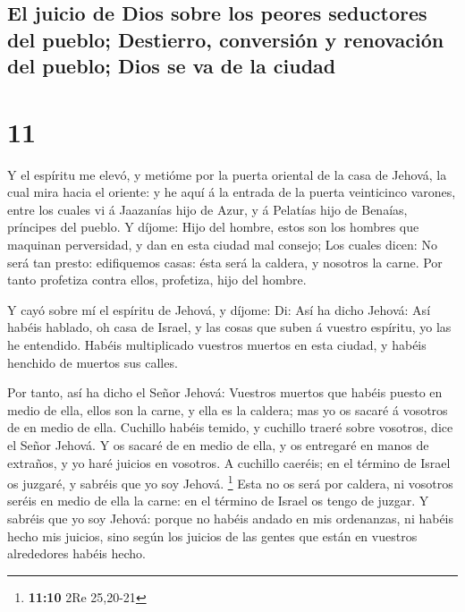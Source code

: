 \hypertarget{el-juicio-de-dios-sobre-los-peores-seductores-del-pueblo-destierro-conversiuxf3n-y-renovaciuxf3n-del-pueblo-dios-se-va-de-la-ciudad}{%
\subsection{El juicio de Dios sobre los peores seductores del pueblo;
Destierro, conversión y renovación del pueblo; Dios se va de la
ciudad}\label{el-juicio-de-dios-sobre-los-peores-seductores-del-pueblo-destierro-conversiuxf3n-y-renovaciuxf3n-del-pueblo-dios-se-va-de-la-ciudad}}

\hypertarget{section-10}{%
\section{11}\label{section-10}}

 Y el espíritu me elevó, y metióme por la puerta oriental
de la casa de Jehová, la cual mira hacia el oriente: y he aquí á la
entrada de la puerta veinticinco varones, entre los cuales vi á
Jaazanías hijo de Azur, y á Pelatías hijo de Benaías, príncipes del
pueblo.  Y díjome: Hijo del hombre, estos son los hombres
que maquinan perversidad, y dan en esta ciudad mal consejo;
 Los cuales dicen: No será tan presto: edifiquemos casas:
ésta será la caldera, y nosotros la carne.  Por tanto
profetiza contra ellos, profetiza, hijo del hombre.

 Y cayó sobre mí el espíritu de Jehová, y díjome: Di: Así
ha dicho Jehová: Así habéis hablado, oh casa de Israel, y las cosas que
suben á vuestro espíritu, yo las he entendido.  Habéis
multiplicado vuestros muertos en esta ciudad, y habéis henchido de
muertos sus calles.

 Por tanto, así ha dicho el Señor Jehová: Vuestros muertos
que habéis puesto en medio de ella, ellos son la carne, y ella es la
caldera; mas yo os sacaré á vosotros de en medio de ella. 
Cuchillo habéis temido, y cuchillo traeré sobre vosotros, dice el Señor
Jehová.  Y os sacaré de en medio de ella, y os entregaré
en manos de extraños, y yo haré juicios en vosotros.  A
cuchillo caeréis; en el término de Israel os juzgaré, y sabréis que yo
soy Jehová. \footnote{\textbf{11:10} 2Re 25,20-21}  Esta
no os será por caldera, ni vosotros seréis en medio de ella la carne: en
el término de Israel os tengo de juzgar.  Y sabréis que
yo soy Jehová: porque no habéis andado en mis ordenanzas, ni habéis
hecho mis juicios, sino según los juicios de las gentes que están en
vuestros alrededores habéis hecho.

